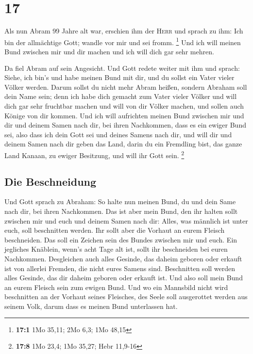 \hypertarget{section-16}{%
\section{17}\label{section-16}}

 Als nun Abram 99 Jahre alt war, erschien ihm der
\textsc{Herr} und sprach zu ihm: Ich bin der allmächtige Gott; wandle
vor mir und sei fromm. \footnote{\textbf{17:1} 1Mo 35,11; 2Mo 6,3; 1Mo
  48,15}  Und ich will meinen Bund zwischen mir und dir
machen und ich will dich gar sehr mehren.

 Da fiel Abram auf sein Angesicht. Und Gott redete weiter
mit ihm und sprach:  Siehe, ich bin's und habe meinen Bund
mit dir, und du sollst ein Vater vieler Völker werden. 
Darum sollst du nicht mehr Abram heißen, sondern Abraham soll dein Name
sein; denn ich habe dich gemacht zum Vater vieler Völker 
und will dich gar sehr fruchtbar machen und will von dir Völker machen,
und sollen auch Könige von dir kommen.  Und ich will
aufrichten meinen Bund zwischen mir und dir und deinem Samen nach dir,
bei ihren Nachkommen, dass es ein ewiger Bund sei, also dass ich dein
Gott sei und deines Samens nach dir,  und will dir und
deinem Samen nach dir geben das Land, darin du ein Fremdling bist, das
ganze Land Kanaan, zu ewiger Besitzung, und will ihr Gott sein.
\footnote{\textbf{17:8} 1Mo 23,4; 1Mo 35,27; Hebr 11,9-16}

\hypertarget{die-beschneidung}{%
\subsection{Die Beschneidung}\label{die-beschneidung}}

 Und Gott sprach zu Abraham: So halte nun meinen Bund, du
und dein Same nach dir, bei ihren Nachkommen.  Das ist
aber mein Bund, den ihr halten sollt zwischen mir und euch und deinem
Samen nach dir: Alles, was männlich ist unter euch, soll beschnitten
werden.  Ihr sollt aber die Vorhaut an eurem Fleisch
beschneiden. Das soll ein Zeichen sein des Bundes zwischen mir und euch.
 Ein jegliches Knäblein, wenn's acht Tage alt ist, sollt
ihr beschneiden bei euren Nachkommen. Desgleichen auch alles Gesinde,
das daheim geboren oder erkauft ist von allerlei Fremden, die nicht
eures Samens sind.  Beschnitten soll werden alles
Gesinde, das dir daheim geboren oder erkauft ist. Und also soll mein
Bund an eurem Fleisch sein zum ewigen Bund.  Und wo ein
Mannsbild nicht wird beschnitten an der Vorhaut seines Fleisches, des
Seele soll ausgerottet werden aus seinem Volk, darum dass es meinen Bund
unterlassen hat.

